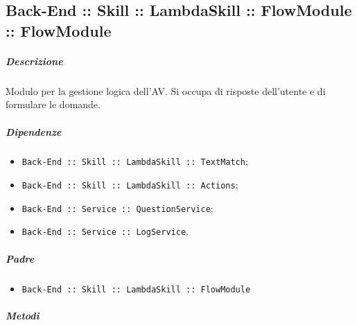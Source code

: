 \documentclass[../ManualeSviluppatore_v1.0.0.tex]{subfiles}
\begin{document}
\subsection{Back-End :: Skill :: LambdaSkill :: FlowModule :: FlowModule}
\subparagraph{Descrizione} Modulo per la gestione logica dell'AV. Si occupa di risposte dell'utente e di formulare le domande.
\subparagraph{Dipendenze}
\begin{itemize}
	\item \texttt{Back-End :: Skill :: LambdaSkill :: TextMatch};
	\item \texttt{Back-End :: Skill :: LambdaSkill :: Actions};
	\item \texttt{Back-End :: Service :: QuestionService};
	\item \texttt{Back-End :: Service :: LogService}.
\end{itemize}
\subparagraph{Padre}
\begin{itemize}
	\item \texttt{Back-End :: Skill :: LambdaSkill :: FlowModule}
\end{itemize}
\subparagraph{Metodi}
\end{document}
